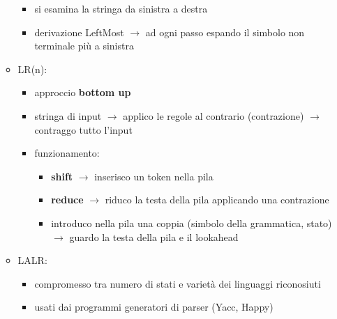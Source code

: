 \documentclass[12pt]{extarticle}
\begin{document}
\begin{itemize}
\begin{itemize}
\begin{itemize}
\begin{itemize}
      \end{itemize}
      \item si esamina la stringa da sinistra a destra
      \item derivazione LeftMost $\rightarrow$ ad ogni passo espando il simbolo non terminale più a sinistra
    \end{itemize}
    \item LR(n):
    \begin{itemize}
      \item approccio \textbf{bottom up}
      \item stringa di input $\rightarrow$ applico le regole al contrario (contrazione) $\rightarrow$ contraggo tutto l'input
      \item funzionamento:
      \begin{itemize}
        \item \textbf{shift} $\rightarrow$ inserisco un token nella pila
        \item \textbf{reduce} $\rightarrow$ riduco la testa della pila applicando una contrazione
        \item introduco nella pila una coppia (simbolo della grammatica, stato) $\rightarrow$ guardo la testa della pila e il lookahead 
      \end{itemize}
    \end{itemize}
    \item LALR:
    \begin{itemize}
      \item compromesso tra numero di stati e varietà dei linguaggi riconosiuti
      \item usati dai programmi generatori di parser (Yacc, Happy)
    \end{itemize}
  \end{itemize}
\end{itemize}
\end{document}
